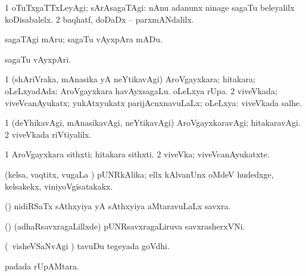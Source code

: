 {{{{{{\bentry
{} 
\gl{\kirxvi}
\bmng
\bnum
\num{1} oTuTxgaTTxLeyAgi; sArAsagaTAgi:  nAnu adanunx ninage sagaTu beleyalilx koDisabalelx. 
\num{2} baqhatf, doDaDx -- parxmANdalilx. 
\enum
\emng
\eentry

\bentry
{} 
\gl{\sakirx}
\bmng
sagaTAgi mAru; sagaTu vAyxpAra mADu. 
\emng
\eentry

\bentry
{}
  \gl{\nA}\bmng
sagaTu vAyxpAri. 
\emng
\eentry

\bentry
{} 
\gl{\gu}
\expl{}
\bmng
\bnum
\num{1} (shAriVraka, mAnasika yA neYtikavAgi) AroVgayxkara; hitakara; oLeLxyadAda:  AroVgayxkara havAyxsagaLu.  oLeLxya rUpa. 
\num{2} viveVkada; viveVcanAyukatx; yukAtxyukatx parijAcnxnavuLaLx; oLeLxya:  viveVkada salhe. 
\enum
\emng
\eentry

\bentry
{} 
\gl{\kirxvi}
\expl{}
\bmng
\bnum
\num{1} (deYhikavAgi, mAnasikavAgi, neYtikavAgi) AroVgayxkaravAgi; hitakaravAgi. 
\num{2} viveVkada riVtiyalilx. 
\enum
\emng
\eentry

\bentry
{}
  \gl{\nA}\bmng
\bnum
\num{1} AroVgayxkara sithxti; hitakara sithxti. 
\num{2} viveVka; viveVcanAyukatxte. 
\enum
\emng
\eentry

\bentry
{}
  \gl{\gu}\bmng
{} 
\emng
\eentry

\bentry
{}
  \gl{\gu}\bmng
(kelsa, vaqtitx, \mo vugaLa \vi) pUNRkAlika; ellx kAlvanUnx oMdeV hudedxge, kelsakekx, viniyoVgisatakakx. 
\emng
\eentry

\bentry
{}
 \gl{\nA}\bmng
(\saM) nidiRSaTx sAthxyiya yA sAthxyiya aMtaravuLaLx savxra. 
\emng
\eentry

\bentry
{}
 \gl{\nA}\bmng
(\saM) (adhaRsavxragaLillxde) pUNRsavxragaLiruva savxrasherxVNi. 
\emng
\eentry

\bentry
{}
  \gl{\nA}\bmng
(\sA\ visheVSaNvAgi \parx) tavuDu tegeyada goVdhi. 
\emng
\eentry

\bentry
{}
  \gl{\nA}\bmng
{} padada rUpAMtara. 
\emng
\eentry

}}}}}}
